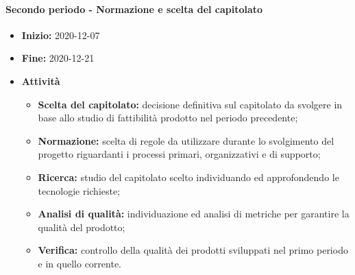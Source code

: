 \paragraph[Secondo periodo]{Secondo periodo - \textnormal{Normazione e scelta del capitolato}}
\begin{itemize}
    \item [] \textbf{Inizio:} 2020-12-07
    \item [] \textbf{Fine:} 2020-12-21
    \item [] \textbf{Attività}
          \begin{itemize}
              \item \textbf{Scelta del capitolato:} decisione definitiva sul capitolato da svolgere in base allo studio di fattibilità prodotto nel periodo precedente;
              \item \textbf{Normazione:} scelta di regole da utilizzare durante lo svolgimento del progetto riguardanti i processi primari, organizzativi e di supporto;
              \item \textbf{Ricerca:} studio del capitolato scelto individuando ed approfondendo le tecnologie richieste;
              \item \textbf{Analisi di qualità:} individuazione ed analisi di metriche per garantire la qualità del prodotto;
              \item \textbf{Verifica:} controllo della qualità dei prodotti sviluppati nel primo periodo e in quello corrente.
          \end{itemize}
\end{itemize}


